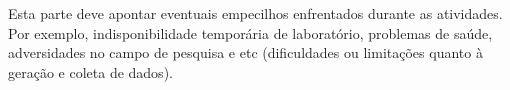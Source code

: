 Esta parte deve apontar eventuais empecilhos enfrentados durante as atividades.
Por exemplo, indisponibilidade temporária de laboratório, problemas de saúde,
adversidades no campo de pesquisa e etc (dificuldades ou limitações quanto à
geração e coleta de dados).
